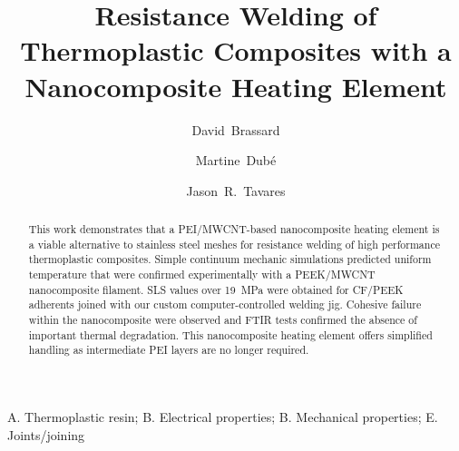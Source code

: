 \documentclass[11pt,review,times]{elsarticle}
\begin{document}


\title{Resistance Welding of Thermoplastic Composites with a Nanocomposite Heating Element}

\author[polymtl,crepec]{David~Brassard}
\author[ets,crepec]{Martine~Dubé}
\author[polymtl,crepec]{Jason~R.~Tavares}


\address[polymtl]{Department of Chemical Engineering, Polytechnique Montréal, P.O. Box 6079 Station Centre-Ville, Montréal, QC, H3C 3A7, Canada}
\address[ets]{Department of Mechanical Engineering, École de technologie supérieure, 1100 Notre-Dame Street West, Montréal, Québec, Canada, H3C 1K3}
\address[crepec]{Research Center for High Performance Polymer and Composite Systems (CREPEC), Polytechnique Montréal, P.O. Box 6079 Station Centre-Ville, Montréal, QC, H3C 3A7, Canada}

\begin{abstract}

This work demonstrates that a PEI/MWCNT-based nanocomposite heating element is a viable alternative to stainless steel meshes for resistance welding of high performance thermoplastic composites. 
Simple continuum mechanic simulations predicted uniform temperature that were confirmed experimentally with a PEEK/MWCNT nanocomposite filament. 
SLS values over \SI{19}{\MPa} were obtained for CF/PEEK adherents joined with our custom computer-controlled welding jig. 
Cohesive failure within the nanocomposite were observed and FTIR tests confirmed the absence of important thermal degradation. 
This nanocomposite heating element offers simplified handling as intermediate PEI layers are no longer required. 

\end{abstract}

\begin{keyword}
A. Thermoplastic resin;  B. Electrical properties;  B. Mechanical properties;  E. Joints/joining 
\end{keyword}

\maketitle

\end{document}
